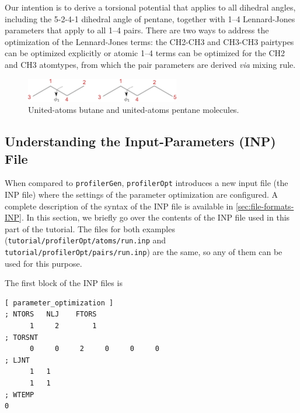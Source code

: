 \documentclass[10pt,a4paper,openany]{memoir}
\numberwithin{equation}{section}
\newcommand{\profileropt}[0]{\texttt{profilerOpt}}
\newcommand{\profilergen}[0]{\texttt{profilerGen}}
\begin{document}
Our intention is to derive a torsional potential that applies to all dihedral
angles, including the 5-2-4-1 dihedral angle of pentane, together with 1--4
Lennard-Jones parameters that apply to all 1--4 pairs.
%
There are two ways to address the optimization of the Lennard-Jones
terms: the CH2-CH3 and CH3-CH3 pairtypes can be optimized explicitly
or atomic 1--4 terms can be optimized for the CH2 and CH3 atomtypes,
from which the pair parameters are derived \textit{via} mixing rule.
%

\begin{figure}[tb]
  \centering
  \includegraphics[width=0.6\textwidth]{butane_pentane}
  \caption{United-atoms butane and united-atoms pentane molecules.}
  \label{fig:tutorial-butane-pentane}
\end{figure}

\subsection{Understanding the Input-Parameters (INP) File}
\label{sec:tutorial-profileropt-inp}

When compared to \profilergen{}, \profileropt{} introduces a new input
file (the INP file) where the settings of the parameter optimization
are configured.
%
A complete description of the syntax of the INP file is available in
\autoref{sec:file-formats-INP}.
%
In this section, we briefly go over the contents of the INP file used
in this part of the tutorial.
%
The files for both examples
(\texttt{tutorial/profilerOpt/atoms/run.inp} and
\texttt{tutorial/profilerOpt/pairs/run.inp}) are the same, so any of
them can be used for this purpose.

The first block of the INP files is

\begin{lstlisting}[language=gromacs]
[ parameter_optimization ]
; NTORS   NLJ    FTORS
      1     2        1
; TORSNT
      0     0     2     0     0     0
; LJNT
      1   1
      1   1
; WTEMP
0
\end{lstlisting}\vspace{2ex}\par
\end{document}
